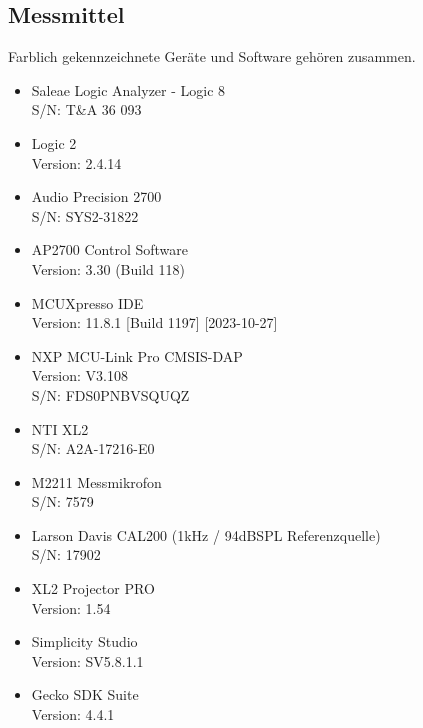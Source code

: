 \documentclass[12pt]{article}
\begin{document}
	\subsection{Messmittel} \label{Messmittel}
	Farblich gekennzeichnete Geräte und Software gehören zusammen.
\begin{itemize}
	\color{green}
	\item Saleae Logic Analyzer - Logic 8 \\
	S/N: T\&A 36 093
	\item Logic 2 \\
	Version: 2.4.14
	\color{red}
	\item Audio Precision 2700 \\
	S/N: SYS2-31822
	\item AP2700 Control Software \\
	Version: 3.30 (Build 118)
	\color{blue}
	\item MCUXpresso IDE\\
	Version: 11.8.1 [Build 1197] [2023-10-27]
	\item NXP MCU-Link Pro CMSIS-DAP \\
	Version: V3.108 \\
	S/N: FDS0PNBVSQUQZ
	\color{brown}
	\item NTI XL2 \\
	S/N: A2A-17216-E0
	\item M2211 Messmikrofon \\
	S/N: 7579
	\item Larson Davis CAL200 (1kHz / 94dBSPL Referenzquelle)\\
	S/N: 17902
	\item XL2 Projector PRO\\
	Version: 1.54
	\color{orange}
	\item Simplicity Studio \\
	Version: SV5.8.1.1
	\item Gecko SDK Suite \\
	Version: 4.4.1
	\color{black}
	\end{itemize}
	
	\newpage
	\thispagestyle{empty} 
\end{document}
